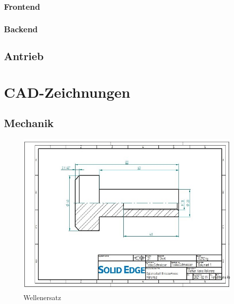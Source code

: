 \subsection{Frontend}



\subsection{Backend}



\section{Antrieb}

\chapter{CAD-Zeichnungen}

\newpage

\section{Mechanik}

\begin{figure} [H]
	\begin{center}
		\includegraphics[angle=90, scale=0.9] {figures/mechanik/Welle_Rechts_Zeichnung.jpg}
		\caption{Wellenersatz}
		\label{fig:Wellenersatz1}
	\end{center}
\end{figure}

\newpage

